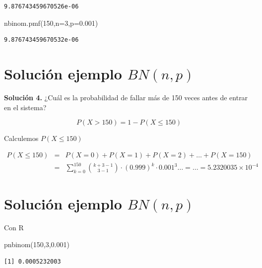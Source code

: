 \documentclass[
  letterpaper,
  DIV=11,
  numbers=noendperiod]{scrreprt}
\newenvironment{Shaded}{\begin{snugshade}}{\end{snugshade}}
\newcommand{\DecValTok}[1]{\textcolor[rgb]{0.68,0.00,0.00}{#1}}
\newcommand{\FloatTok}[1]{\textcolor[rgb]{0.68,0.00,0.00}{#1}}
\newcommand{\FunctionTok}[1]{\textcolor[rgb]{0.28,0.35,0.67}{#1}}
\newcommand{\NormalTok}[1]{\textcolor[rgb]{0.00,0.23,0.31}{#1}}
\newcommand{\OperatorTok}[1]{\textcolor[rgb]{0.37,0.37,0.37}{#1}}
\begin{document}
\begin{verbatim}
9.876743459670526e-06
\end{verbatim}

\begin{Shaded}
\begin{Highlighting}[]
\NormalTok{nbinom.pmf(}\DecValTok{150}\NormalTok{,n}\OperatorTok{=}\DecValTok{3}\NormalTok{,p}\OperatorTok{=}\FloatTok{0.001}\NormalTok{)}
\end{Highlighting}
\end{Shaded}

\begin{verbatim}
9.876743459670532e-06
\end{verbatim}

\section{\texorpdfstring{Solución ejemplo
\(BN(n,p)\)}{Solución ejemplo BN(n,p)}}\label{soluciuxf3n-ejemplo-bnnp}

\textbf{Solución 4.} ¿Cuál es la probabilidad de fallar más de 150 veces
antes de entrar en el sistema?

\[P(X>150)=1-P(X\leq 150)\]

Calculemos \(P(X\leq 150)\)

\begin{eqnarray*}
P(X\leq 150) &=& P(X=0)+P(X=1)+P(X=2)+\ldots+P(X=150)\\
&=& \sum_{k=0}^{150} {k+3-1\choose 3-1} \cdot (0.999)^{k}\cdot 0.001^3\ldots = \ldots =\ensuremath{5.2320035\times 10^{-4}}
\end{eqnarray*}

\section{\texorpdfstring{Solución ejemplo
\(BN(n,p)\)}{Solución ejemplo BN(n,p)}}\label{soluciuxf3n-ejemplo-bnnp-1}

Con R

\begin{Shaded}
\begin{Highlighting}[]
\FunctionTok{pnbinom}\NormalTok{(}\DecValTok{150}\NormalTok{,}\DecValTok{3}\NormalTok{,}\FloatTok{0.001}\NormalTok{)}
\end{Highlighting}
\end{Shaded}

\begin{verbatim}
[1] 0.0005232003
\end{verbatim}
\end{document}
